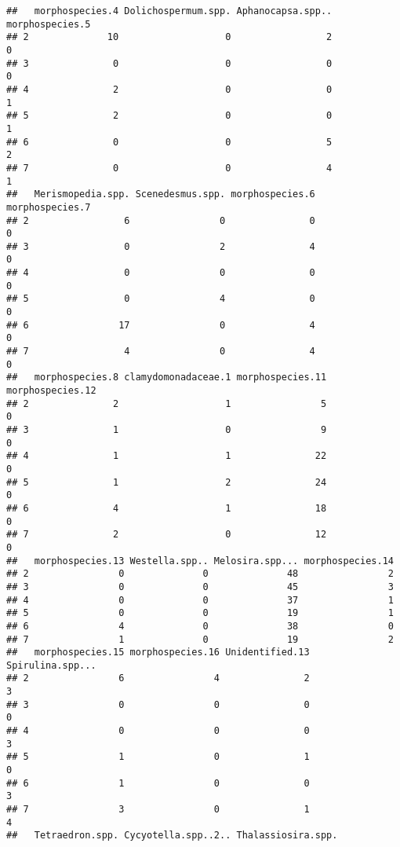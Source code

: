 \documentclass[]{article}
\begin{document}
\begin{verbatim}
##   morphospecies.4 Dolichospermum.spp. Aphanocapsa.spp.. morphospecies.5
## 2              10                   0                 2               0
## 3               0                   0                 0               0
## 4               2                   0                 0               1
## 5               2                   0                 0               1
## 6               0                   0                 5               2
## 7               0                   0                 4               1
##   Merismopedia.spp. Scenedesmus.spp. morphospecies.6 morphospecies.7
## 2                 6                0               0               0
## 3                 0                2               4               0
## 4                 0                0               0               0
## 5                 0                4               0               0
## 6                17                0               4               0
## 7                 4                0               4               0
##   morphospecies.8 clamydomonadaceae.1 morphospecies.11 morphospecies.12
## 2               2                   1                5                0
## 3               1                   0                9                0
## 4               1                   1               22                0
## 5               1                   2               24                0
## 6               4                   1               18                0
## 7               2                   0               12                0
##   morphospecies.13 Westella.spp.. Melosira.spp... morphospecies.14
## 2                0              0              48                2
## 3                0              0              45                3
## 4                0              0              37                1
## 5                0              0              19                1
## 6                4              0              38                0
## 7                1              0              19                2
##   morphospecies.15 morphospecies.16 Unidentified.13 Spirulina.spp...
## 2                6                4               2                3
## 3                0                0               0                0
## 4                0                0               0                3
## 5                1                0               1                0
## 6                1                0               0                3
## 7                3                0               1                4
##   Tetraedron.spp. Cycyotella.spp..2.. Thalassiosira.spp.

\end{verbatim}
\end{document}
